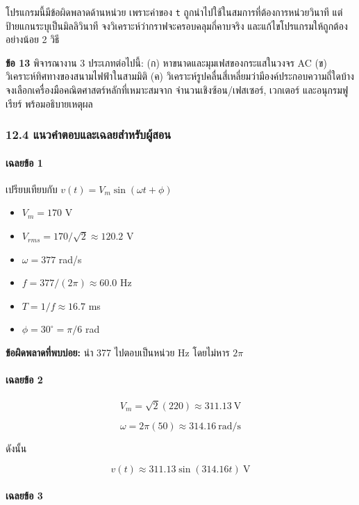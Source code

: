 โปรแกรมนี้มีข้อผิดพลาดด้านหน่วย เพราะค่าของ \texttt{t} ถูกนำไปใช้ในสมการที่ต้องการหน่วยวินาที แต่ป้ายแกนระบุเป็นมิลลิวินาที จงวิเคราะห์ว่ากราฟจะครอบคลุมกี่คาบจริง และแก้ไขโปรแกรมให้ถูกต้องอย่างน้อย 2 วิธี

\textbf{ข้อ 13} พิจารณางาน 3 ประเภทต่อไปนี้:
(ก) หาขนาดและมุมเฟสของกระแสในวงจร AC
(ข) วิเคราะห์ทิศทางของสนามไฟฟ้าในสามมิติ
(ค) วิเคราะห์รูปคลื่นสี่เหลี่ยมว่ามีองค์ประกอบความถี่ใดบ้าง
จงเลือกเครื่องมือคณิตศาสตร์หลักที่เหมาะสมจาก จำนวนเชิงซ้อน/เฟสเซอร์, เวกเตอร์ และอนุกรมฟูเรียร์ พร้อมอธิบายเหตุผล

 

\subsubsection{12.4 แนวคำตอบและเฉลยสำหรับผู้สอน}

\paragraph{เฉลยข้อ 1}

เปรียบเทียบกับ $v(t)=V_m\sin(\omega t+\phi)$

\begin{itemize}
    \item $V_m=170$ V
    \item $V_{rms}=170/\sqrt{2}\approx120.2$ V
    \item $\omega=377$ rad/s
    \item $f=377/(2\pi)\approx60.0$ Hz
    \item $T=1/f\approx16.7$ ms
    \item $\phi=30^\circ=\pi/6$ rad
\end{itemize}

\textbf{ข้อผิดพลาดที่พบบ่อย:} นำ 377 ไปตอบเป็นหน่วย Hz โดยไม่หาร $2\pi$

\paragraph{เฉลยข้อ 2}

\[
V_m=\sqrt{2}(220)\approx311.13\ \mathrm{V}
\]

\[
\omega=2\pi(50)\approx314.16\ \mathrm{rad/s}
\]

ดังนั้น

\[
v(t)\approx311.13\sin(314.16t)\ \mathrm{V}
\]

\paragraph{เฉลยข้อ 3}

